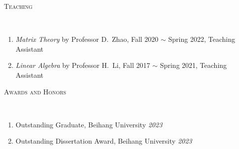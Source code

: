 \documentclass[a4paper, 10pt]{article}
\newenvironment{changemargin}[2]{%
  \begin{list}{}{%
    \setlength{\topsep}{0pt}%
    \setlength{\leftmargin}{#1}%
    \setlength{\rightmargin}{#2}%
    \setlength{\listparindent}{\parindent}%
    \setlength{\itemindent}{\parindent}%
    \setlength{\parsep}{\parskip}%
  }%
  \item[]}{\end{list}
}
\newcommand{\lineover}{
	\begin{changemargin}{-0.05in}{-0.05in}
		\vspace*{-8pt}
		\hrulefill \\
		\vspace*{-2pt}
	\end{changemargin}
}
\newcommand{\header}[1]{
	\begin{changemargin}{-0.5in}{-0.5in}
		\scshape{#1}\\
  	\lineover
	\end{changemargin}
}
\newenvironment{body} {
	\vspace*{-16pt}
	\begin{changemargin}{-0.3in}{-0.5in}
  }	
	{\end{changemargin}
}
\begin{document}

%
\bigskip
\header{\LARGE{Teaching}}
\begin{body}
	\vspace{18pt}
	\begin{enumerate}
	\item \emph{Matrix Theory} by Professor D.~Zhao, Fall 2020 $\sim$ Spring 2022, Teaching Assistant
	\item \emph{Linear Algebra} by Professor H.~Li, Fall 2017 $\sim$ Spring 2021, Teaching Assistant
	\end{enumerate}
\end{body}

\bigskip
\header{\LARGE{Awards and Honors}}
\begin{body}
    \vspace{18pt}
    \begin{enumerate}
	\item {Outstanding Graduate}, Beihang University \hfill{} \emph{2023}
	\item {Outstanding Dissertation Award}, Beihang University \hfill{} \emph{2023}
    \end{enumerate}
\end{body}
\end{document}
